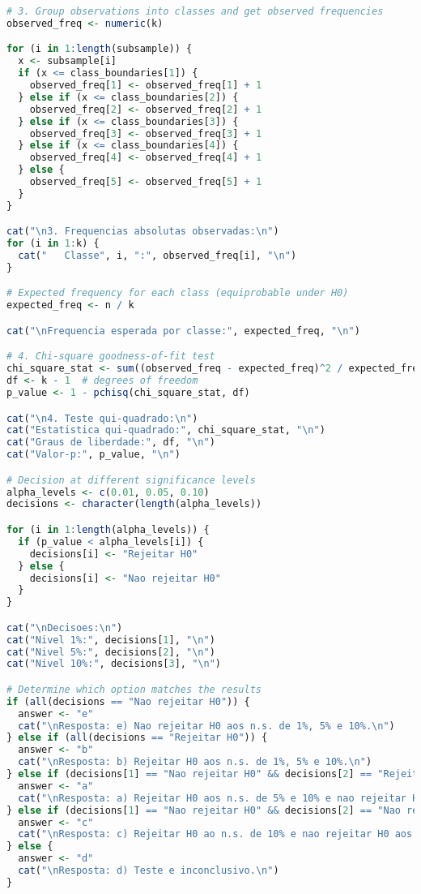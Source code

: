 \documentclass[11pt,a4paper]{article}
\begin{document}
\begin{lstlisting}[language=R]
# 3. Group observations into classes and get observed frequencies
observed_freq <- numeric(k)

for (i in 1:length(subsample)) {
  x <- subsample[i]
  if (x <= class_boundaries[1]) {
    observed_freq[1] <- observed_freq[1] + 1
  } else if (x <= class_boundaries[2]) {
    observed_freq[2] <- observed_freq[2] + 1
  } else if (x <= class_boundaries[3]) {
    observed_freq[3] <- observed_freq[3] + 1
  } else if (x <= class_boundaries[4]) {
    observed_freq[4] <- observed_freq[4] + 1
  } else {
    observed_freq[5] <- observed_freq[5] + 1
  }
}

cat("\n3. Frequencias absolutas observadas:\n")
for (i in 1:k) {
  cat("   Classe", i, ":", observed_freq[i], "\n")
}

# Expected frequency for each class (equiprobable under H0)
expected_freq <- n / k

cat("\nFrequencia esperada por classe:", expected_freq, "\n")

# 4. Chi-square goodness-of-fit test
chi_square_stat <- sum((observed_freq - expected_freq)^2 / expected_freq)
df <- k - 1  # degrees of freedom
p_value <- 1 - pchisq(chi_square_stat, df)

cat("\n4. Teste qui-quadrado:\n")
cat("Estatistica qui-quadrado:", chi_square_stat, "\n")
cat("Graus de liberdade:", df, "\n")
cat("Valor-p:", p_value, "\n")

# Decision at different significance levels
alpha_levels <- c(0.01, 0.05, 0.10)
decisions <- character(length(alpha_levels))

for (i in 1:length(alpha_levels)) {
  if (p_value < alpha_levels[i]) {
    decisions[i] <- "Rejeitar H0"
  } else {
    decisions[i] <- "Nao rejeitar H0"
  }
}

cat("\nDecisoes:\n")
cat("Nivel 1%:", decisions[1], "\n")
cat("Nivel 5%:", decisions[2], "\n")
cat("Nivel 10%:", decisions[3], "\n")

# Determine which option matches the results
if (all(decisions == "Nao rejeitar H0")) {
  answer <- "e"
  cat("\nResposta: e) Nao rejeitar H0 aos n.s. de 1%, 5% e 10%.\n")
} else if (all(decisions == "Rejeitar H0")) {
  answer <- "b"
  cat("\nResposta: b) Rejeitar H0 aos n.s. de 1%, 5% e 10%.\n")
} else if (decisions[1] == "Nao rejeitar H0" && decisions[2] == "Rejeitar H0" && decisions[3] == "Rejeitar H0") {
  answer <- "a"
  cat("\nResposta: a) Rejeitar H0 aos n.s. de 5% e 10% e nao rejeitar H0 ao n.s. de 1%.\n")
} else if (decisions[1] == "Nao rejeitar H0" && decisions[2] == "Nao rejeitar H0" && decisions[3] == "Rejeitar H0") {
  answer <- "c"
  cat("\nResposta: c) Rejeitar H0 ao n.s. de 10% e nao rejeitar H0 aos n.s. de 1% e 5%.\n")
} else {
  answer <- "d"
  cat("\nResposta: d) Teste e inconclusivo.\n")
}
\end{lstlisting}
\end{document}
